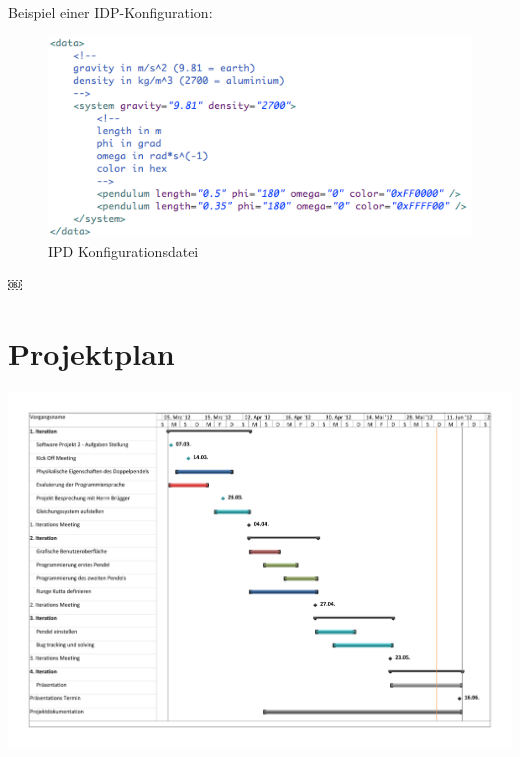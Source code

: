 \documentclass[12pt]{article}
\numberwithin{equation}{subsection}
\begin{document}
Beispiel einer IDP-Konfiguration:

\begin{figure}[H]
	\centering
	\includegraphics[width=\textwidth]{xml.png}
	\caption{IPD Konfigurationsdatei}
	\label{fig:xml}
\end{figure}

\newpage
￼\listoffigures

\newpage
\nocite{*}



\appendix
\section{Projektplan}
\includegraphics[angle=90, width=\textwidth]{projektplan.pdf}
\end{document}
